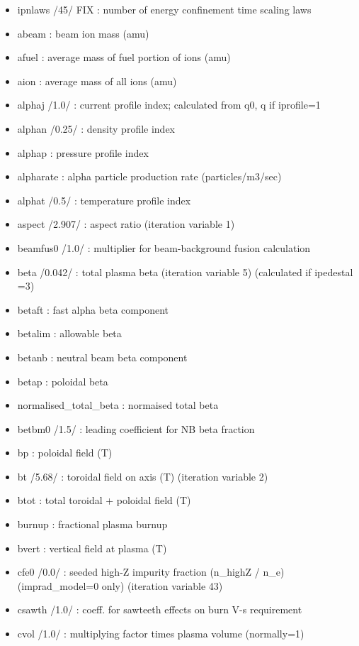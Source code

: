 \documentclass[
]{article}
\providecommand{\tightlist}{%
  \setlength{\itemsep}{0pt}\setlength{\parskip}{0pt}}
\begin{document}
\begin{itemize}
\tightlist
\item
  ipnlaws /45/ FIX : number of energy confinement time scaling laws
\item
  abeam : beam ion mass (amu)
\item
  afuel : average mass of fuel portion of ions (amu)
\item
  aion : average mass of all ions (amu)
\item
  alphaj /1.0/ : current profile index; calculated from q0, q if
  iprofile=1
\item
  alphan /0.25/ : density profile index
\item
  alphap : pressure profile index
\item
  alpharate : alpha particle production rate (particles/m3/sec)
\item
  alphat /0.5/ : temperature profile index
\item
  aspect /2.907/ : aspect ratio (iteration variable 1)
\item
  beamfus0 /1.0/ : multiplier for beam-background fusion calculation
\item
  beta /0.042/ : total plasma beta (iteration variable 5) (calculated if
  ipedestal =3)
\item
  betaft : fast alpha beta component
\item
  betalim : allowable beta
\item
  betanb : neutral beam beta component
\item
  betap : poloidal beta
\item
  normalised\_total\_beta : normaised total beta
\item
  betbm0 /1.5/ : leading coefficient for NB beta fraction
\item
  bp : poloidal field (T)
\item
  bt /5.68/ : toroidal field on axis (T) (iteration variable 2)
\item
  btot : total toroidal + poloidal field (T)
\item
  burnup : fractional plasma burnup
\item
  bvert : vertical field at plasma (T)
\item
  cfe0 /0.0/ : seeded high-Z impurity fraction (n\_highZ / n\_e)
  (imprad\_model=0 only) (iteration variable 43)
\item
  csawth /1.0/ : coeff. for sawteeth effects on burn V-s requirement
\item
  cvol /1.0/ : multiplying factor times plasma volume (normally=1)

\end{itemize}
\end{document}

